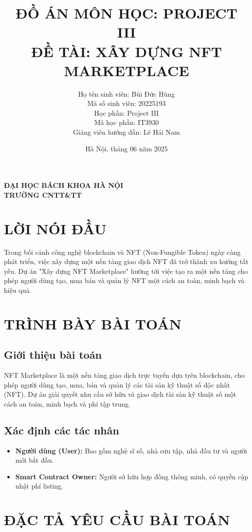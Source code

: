 \documentclass[a4paper,12pt]{report}
\title{\textbf{ĐỒ ÁN MÔN HỌC: PROJECT III} \\ \textbf{ĐỀ TÀI: XÂY DỰNG NFT MARKETPLACE}}
\author{
    Họ tên sinh viên: Bùi Đức Hùng \\
    Mã số sinh viên: 20225193 \\
    Học phần: Project III \\
    Mã học phần: IT3930 \\
    Giảng viên hướng dẫn: Lê Hải Nam
}
\date{Hà Nội, tháng 06 năm 2025}
\begin{document}
\maketitle
\begin{center}
    \textbf{ĐẠI HỌC BÁCH KHOA HÀ NỘI} \\
    \textbf{TRƯỜNG CNTT\&TT}
\end{center}

\tableofcontents
\newpage

\chapter{LỜI NÓI ĐẦU}
Trong bối cảnh công nghệ blockchain và NFT (Non-Fungible Token) ngày càng phát triển, việc xây dựng một nền tảng giao dịch NFT đã trở thành xu hướng tất yếu. Dự án "Xây dựng NFT Marketplace" hướng tới việc tạo ra một nền tảng cho phép người dùng tạo, mua bán và quản lý NFT một cách an toàn, minh bạch và hiệu quả.

\chapter{TRÌNH BÀY BÀI TOÁN}
\section{Giới thiệu bài toán}
NFT Marketplace là một nền tảng giao dịch trực tuyến dựa trên blockchain, cho phép người dùng tạo, mua, bán và quản lý các tài sản kỹ thuật số độc nhất (NFT). Dự án giải quyết nhu cầu sở hữu và giao dịch tài sản kỹ thuật số một cách an toàn, minh bạch và phi tập trung.

\section{Xác định các tác nhân}
\begin{itemize}
    \item \textbf{Người dùng (User):} Bao gồm nghệ sĩ số, nhà sưu tập, nhà đầu tư và người mới bắt đầu.
    \item \textbf{Smart Contract Owner:} Người sở hữu hợp đồng thông minh, có quyền cập nhật phí listing.
\end{itemize}

\chapter{ĐẶC TẢ YÊU CẦU BÀI TOÁN}
\end{document}
